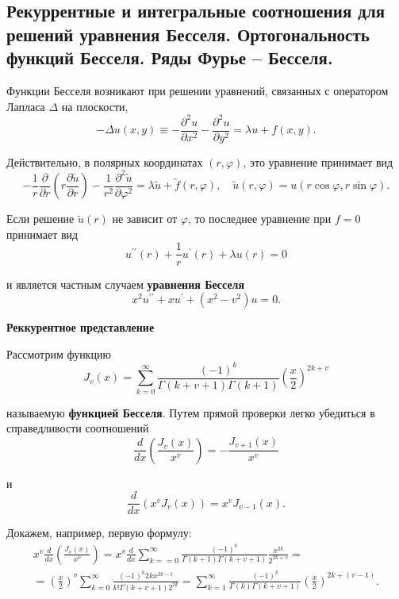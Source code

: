 \subsection{Рекуррентные и интегральные соотношения для решений уравнения Бесселя. Ортогональность функций Бесселя. Ряды Фурье – Бесселя.}
\label{sec:bessel}

Функции Бесселя возникают при решении уравнений, связанных с оператором Лапласа $\Delta$ на плоскости,
\[
-\Delta u(x, y) \equiv-\frac{\partial^{2} u}{\partial x^{2}}-\frac{\partial^{2} u}{\partial y^{2}}=\lambda u+f(x, y) .
\]

Действительно, в полярных координатах $(r, \varphi)$, это уравнение принимает вид
\[
-\frac{1}{r} \frac{\partial}{\partial r}\left(r \frac{\partial \widetilde{u}}{\partial r}\right)-\frac{1}{r^{2}} \frac{\partial^{2} \widetilde{u}}{\partial \varphi^{2}}=\lambda \widetilde{u}+\widetilde{f}(r, \varphi), \quad \widetilde{u}(r, \varphi)=u(r \cos \varphi, r \sin \varphi) .
\]

Если решение $\widetilde{u}(r)$ не зависит от $\varphi$, то последнее уравнение при $f=0$ принимает вид
\[
u^{\prime \prime}(r)+\frac{1}{r} u^{\prime}(r)+\lambda u(r)=0
\]

и является частным случаем \textbf{уравнения Бесселя}
\[
x^{2} u^{\prime \prime}+x u^{\prime}+\left(x^{2}-v^{2}\right) u=0 .
\]

\textbf{Реккурентное представление}

Рассмотрим функцию
\[
J_v(x) = \sum_{k=0}^{\infty}\frac{(-1)^k}{\Gamma(k+v+1)\Gamma(k+1)} \left(\frac{x}{2}\right)^{2k+v}
\]

называемую \textbf{функцией Бесселя}. Путем прямой проверки легко убедиться в справедливости соотношений
\[
\frac{d}{d x}\left(\frac{J_{v}(x)}{x^{v}}\right)=-\frac{J_{v+1}(x)}{x^{v}}
\]

и
\[
\frac{d}{d x}\left(x^{v} J_{v}(x)\right)=x^{v} J_{v-1}(x) .
\]

Докажем, например, первую формулу:
\[
\begin{aligned}
	x^{v} \frac{d}{d x}\left(\frac{J_{v}(x)}{x^{v}}\right)=x^{v} \frac{d}{d x} \sum_{k==0}^{\infty} \frac{(-1)^{k}}{\Gamma(k+1) \Gamma(k+v+1)} \frac{x^{2 k}}{2^{2 k+v}}= \\
	=\left(\frac{x}{2}\right)^{v} \sum_{k=0}^{\infty} \frac{(-1)^{k} 2 k x^{2 k-1}}{k ! \Gamma(k+v+1) 2^{2 k}}=\sum_{k=1}^{\infty} \frac{(-1)^{k}}{\Gamma(k) \Gamma(k+v+1)}\left(\frac{x}{2}\right)^{2 k+(v-1)} .
\end{aligned}
\]


